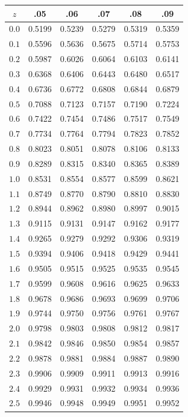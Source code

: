 \begin{center}
\small
\begin{tabular}{c|ccccc}
\toprule
$z$ & .05 & .06 & .07 & .08 & .09 \\
\midrule
$0.0$ & 0.5199 & 0.5239 & 0.5279 & 0.5319 & 0.5359 \\
$0.1$ & 0.5596 & 0.5636 & 0.5675 & 0.5714 & 0.5753 \\
$0.2$ & 0.5987 & 0.6026 & 0.6064 & 0.6103 & 0.6141 \\
$0.3$ & 0.6368 & 0.6406 & 0.6443 & 0.6480 & 0.6517 \\
$0.4$ & 0.6736 & 0.6772 & 0.6808 & 0.6844 & 0.6879 \\
$0.5$ & 0.7088 & 0.7123 & 0.7157 & 0.7190 & 0.7224 \\
$0.6$ & 0.7422 & 0.7454 & 0.7486 & 0.7517 & 0.7549 \\
$0.7$ & 0.7734 & 0.7764 & 0.7794 & 0.7823 & 0.7852 \\
$0.8$ & 0.8023 & 0.8051 & 0.8078 & 0.8106 & 0.8133 \\
$0.9$ & 0.8289 & 0.8315 & 0.8340 & 0.8365 & 0.8389 \\
$1.0$ & 0.8531 & 0.8554 & 0.8577 & 0.8599 & 0.8621 \\
$1.1$ & 0.8749 & 0.8770 & 0.8790 & 0.8810 & 0.8830 \\
$1.2$ & 0.8944 & 0.8962 & 0.8980 & 0.8997 & 0.9015 \\
$1.3$ & 0.9115 & 0.9131 & 0.9147 & 0.9162 & 0.9177 \\
$1.4$ & 0.9265 & 0.9279 & 0.9292 & 0.9306 & 0.9319 \\
$1.5$ & 0.9394 & 0.9406 & 0.9418 & 0.9429 & 0.9441 \\
$1.6$ & 0.9505 & 0.9515 & 0.9525 & 0.9535 & 0.9545 \\
$1.7$ & 0.9599 & 0.9608 & 0.9616 & 0.9625 & 0.9633 \\
$1.8$ & 0.9678 & 0.9686 & 0.9693 & 0.9699 & 0.9706 \\
$1.9$ & 0.9744 & 0.9750 & 0.9756 & 0.9761 & 0.9767 \\
$2.0$ & 0.9798 & 0.9803 & 0.9808 & 0.9812 & 0.9817 \\
$2.1$ & 0.9842 & 0.9846 & 0.9850 & 0.9854 & 0.9857 \\
$2.2$ & 0.9878 & 0.9881 & 0.9884 & 0.9887 & 0.9890 \\
$2.3$ & 0.9906 & 0.9909 & 0.9911 & 0.9913 & 0.9916 \\
$2.4$ & 0.9929 & 0.9931 & 0.9932 & 0.9934 & 0.9936 \\
$2.5$ & 0.9946 & 0.9948 & 0.9949 & 0.9951 & 0.9952 \\

\end{tabular}
\end{center}
